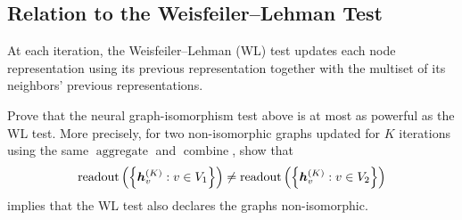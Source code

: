 \subsection{Relation to the Weisfeiler--Lehman Test}

At each iteration, the Weisfeiler--Lehman (WL) test updates each node
representation using its previous representation together with the multiset of
its neighbors' previous representations.

Prove that the neural graph-isomorphism test above is at most as powerful as
the WL test. More precisely, for two non-isomorphic graphs updated for \(K\)
iterations using the same \(\operatorname{aggregate}\) and
\(\operatorname{combine}\), show that
\[
  \operatorname{readout}
  \left(\left\{\bm{h}_v^{(K)}:v\in V_1\right\}\right)
  \ne
  \operatorname{readout}
  \left(\left\{\bm{h}_v^{(K)}:v\in V_2\right\}\right)
\]
implies that the WL test also declares the graphs non-isomorphic.

